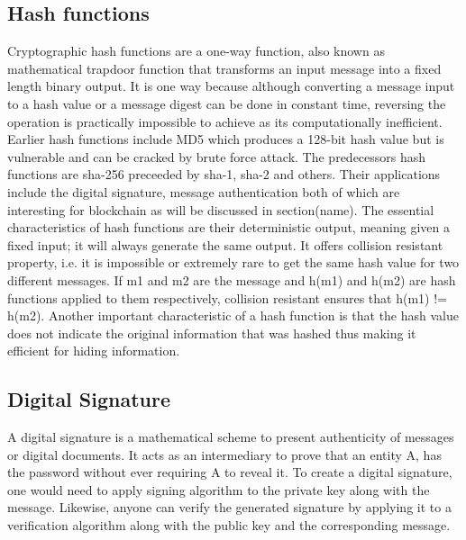 \subsection{Hash functions}
Cryptographic hash functions are a one-way function, also known as mathematical
trapdoor function that transforms an input message into a fixed length binary
output. It is one way because although converting a message input to a hash
value or a message digest can be done in constant time, reversing the operation
is practically impossible to achieve as its computationally inefficient.
Earlier hash functions include MD5 which produces a 128-bit hash value but is
vulnerable and can be cracked by brute force attack.  The predecessors hash
functions are sha-256 preceeded by sha-1, sha-2 and others. Their applications
include the digital signature, message authentication both of which are
interesting for blockchain as will be discussed in section(name). The essential
characteristics of hash functions are their deterministic output, meaning given
a fixed input; it will always generate the same output. It offers collision
resistant property, i.e. it is impossible or extremely rare to get the same
hash value for two different messages.  If m1 and m2 are the message and h(m1)
and h(m2) are hash functions applied to them respectively, collision resistant
ensures that h(m1) != h(m2). Another important characteristic of a hash
function is that the hash value does not indicate the original information that
was hashed thus making it efficient for hiding information.


\subsection{Digital Signature}
A digital signature is a mathematical scheme to present authenticity of
messages or digital documents. It acts as an intermediary to prove that an
entity A, has the password without ever requiring A to reveal it. To create a
digital signature, one would need to apply signing algorithm to the private key
along with the message. Likewise, anyone can verify the generated signature by
applying it to a verification algorithm along with the public key and the
corresponding message.



